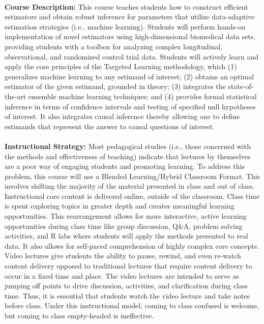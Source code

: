 \documentclass[11pt]{article}
\begin{document}
\textbf {\large \\ Course Description:}
This course teaches students how to construct efficient estimators and obtain
robust inference for parameters that utilize data-adaptive estimation
strategies (i.e., machine learning). Students will perform hands-on
implementation of novel estimators using high-dimensional biomedical data sets,
providing students with a toolbox for analyzing complex longitudinal,
observational, and randomized control trial data. Students will actively learn
and apply the core principles of the Targeted Learning methodology, which (1)
generalizes machine learning to any estimand of interest; (2) obtains an optimal
estimator of the given estimand, grounded in theory; (3) integrates the
state-of-the-art ensemble machine learning techniques; and (4) provides formal
statistical inference in terms of confidence intervals and testing of specified
null hypotheses of interest. It also integrates causal inference thereby
allowing one to define estimands that represent the answer to causal questions
of interest. \\

\textbf {\large \\ Instructional Strategy:}
Most pedagogical studies (i.e., those concerned with the methods and
effectiveness of teaching) indicate that lectures by themselves are a poor way
of engaging students and promoting learning. To address this problem, this
course will use a Blended Learning/Hybrid Classroom Format. This involves
shifting the majority of the material presented in class and out of class.
Instructional core content is delivered online, outside of the classroom. Class
time is spent exploring topics in greater depth and creates meaningful learning
opportunities. This rearrangement allows for more interactive, active learning
opportunities during class time like group discussion, Q\&A, problem solving
activities, and R labs where students will apply the methods presented to real
data. It also allows for self-paced comprehension of highly complex core
concepts. Video lectures give students the ability to pause, rewind, and even
re-watch content delivery opposed to traditional lectures that require content
delivery to occur in a fixed time and place. The video lectures are intended to
serve as jumping off points to drive discussion, activities, and clarification
during class time. Thus, it is essential that students watch the video lecture
and take notes before class. Under this instructional model, coming to class
confused is welcome, but coming to class empty-headed is ineffective. \\
\end{document}
